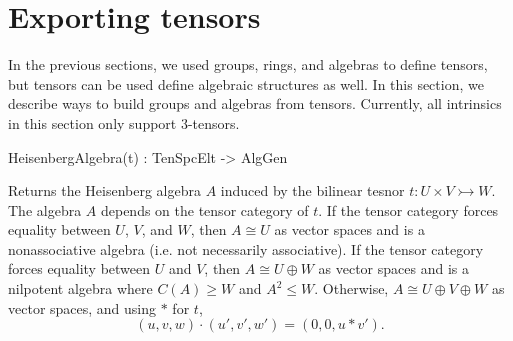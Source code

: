 \section{Exporting tensors}

In the previous sections, we used groups, rings, and algebras to define tensors, but tensors can be used define algebraic structures as well.
In this section, we describe ways to build groups and algebras from tensors. 
Currently, all intrinsics in this section only support 3-tensors.

\begin{intrinsics}
HeisenbergAlgebra(t) : TenSpcElt -> AlgGen
\end{intrinsics}

Returns the Heisenberg algebra $A$ induced by the bilinear tesnor $t: U\times V\rightarrowtail W$. 
The algebra $A$ depends on the tensor category of $t$. 
If the tensor category forces equality between $U$, $V$, and $W$, then $A\cong U$ as vector spaces and is a nonassociative algebra (i.e.\! not necessarily associative). 
If the tensor category forces equality between $U$ and $V$, then $A\cong U\oplus W$ as vector spaces and is a nilpotent algebra where $C(A)\geq W$ and $A^2\leq W$. 
Otherwise, $A\cong U\oplus V\oplus W$ as vector spaces, and using $*$ for $t$, 
\[ (u,v,w)\cdot (u',v',w') = (0,0,u*v'). \]

